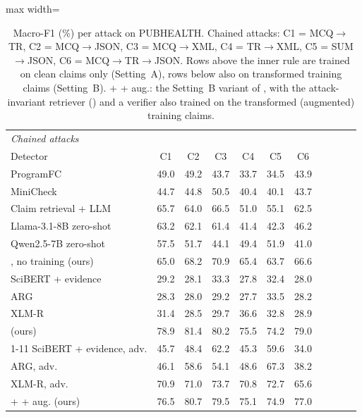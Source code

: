 \begin{table}[t]
\begin{adjustbox}{max width=\textwidth}
\begin{tabular}{lcccccccccc}
\multicolumn{11}{l}{\emph{Chained attacks}} \\
Detector & C1 & C2 & C3 & C4 & C5 & C6 &  &  &  &  \\
\midrule
ProgramFC \citep{pan2023programfc} & 49.0 & 49.2 & 43.7 & 33.7 & 34.5 & 43.9 &  &  &  &  \\
MiniCheck \citep{tang2024minicheck} & 44.7 & 44.8 & 50.5 & 40.4 & 40.1 & 43.7 &  &  &  &  \\
Claim retrieval + LLM \citep{pikuliak2023multiclaim} & 65.7 & 64.0 & 66.5 & 51.0 & 55.1 & 62.5 &  &  &  &  \\
Llama-3.1-8B zero-shot \citep{grattafiori2024llama3} & 63.2 & 62.1 & 61.4 & 41.4 & 42.3 & 46.2 &  &  &  &  \\
Qwen2.5-7B zero-shot \citep{qwen2024qwen25} & 57.5 & 51.7 & 44.1 & 49.4 & 51.9 & 41.0 &  &  &  &  \\
\method{}, no training (ours) & 65.0 & 68.2 & 70.9 & 65.4 & 63.7 & 66.6 &  &  &  &  \\
SciBERT + evidence \citep{kotonya2020pubhealth} & 29.2 & 28.1 & 33.3 & 27.8 & 32.4 & 28.0 &  &  &  &  \\
ARG \citep{hu2024arg} & 28.3 & 28.0 & 29.2 & 27.7 & 33.5 & 28.2 &  &  &  &  \\
XLM-R \citep{conneau2020xlmr} & 31.4 & 28.5 & 29.7 & 36.6 & 32.8 & 28.9 &  &  &  &  \\
\method{} (ours) & 78.9 & 81.4 & 80.2 & 75.5 & 74.2 & 79.0 &  &  &  &  \\
\cmidrule(lr){1-11}
SciBERT + evidence, adv. \citep{kotonya2020pubhealth} & 45.7 & 48.4 & 62.2 & 45.3 & 59.6 & 34.0 &  &  &  &  \\
ARG, adv. \citep{hu2024arg} & 46.1 & 58.6 & 54.1 & 48.6 & 67.3 & 38.2 &  &  &  &  \\
XLM-R, adv. \citep{conneau2020xlmr} & 70.9 & 71.0 & 73.7 & 70.8 & 72.7 & 65.6 &  &  &  &  \\
\method{} + \air{} + aug. (ours) & 76.5 & 80.7 & 79.5 & 75.1 & 74.9 & 77.0 &  &  &  &  \\
\bottomrule
\end{tabular}\end{adjustbox}
\caption{Macro-F1 (\%) per attack on PUBHEALTH. Chained attacks: C1 = MCQ$\to$TR, C2 = MCQ$\to$JSON, C3 = MCQ$\to$XML, C4 = TR$\to$XML, C5 = SUM$\to$JSON, C6 = MCQ$\to$TR$\to$JSON. Rows above the inner rule are trained on clean claims only (Setting~A), rows below also on transformed training claims (Setting~B). \method{} + \air{} + aug.: the Setting~B variant of \method{}, with the attack-invariant retriever (\air{}) and a verifier also trained on the transformed (augmented) training claims.}
\label{tab:per_pubhealth}
\end{table}

